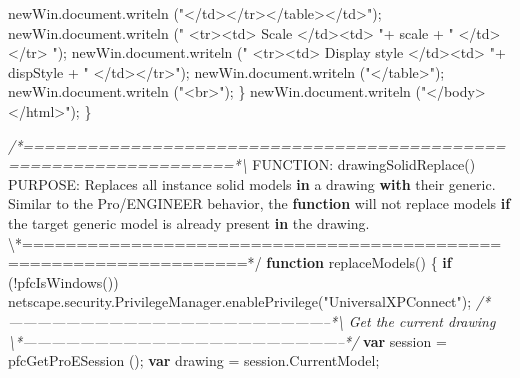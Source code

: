 \documentclass[]{article}
\newenvironment{Shaded}{}{}
\newcommand{\KeywordTok}[1]{\textcolor[rgb]{0.00,0.44,0.13}{\textbf{{#1}}}}
\newcommand{\StringTok}[1]{\textcolor[rgb]{0.25,0.44,0.63}{{#1}}}
\newcommand{\CommentTok}[1]{\textcolor[rgb]{0.38,0.63,0.69}{\textit{{#1}}}}
\newcommand{\OtherTok}[1]{\textcolor[rgb]{0.00,0.44,0.13}{{#1}}}
\newcommand{\FunctionTok}[1]{\textcolor[rgb]{0.02,0.16,0.49}{{#1}}}
\newcommand{\NormalTok}[1]{{#1}}
\begin{document}
\begin{Shaded}
\begin{Highlighting}[]
      \OtherTok{newWin}\NormalTok{.}\OtherTok{document}\NormalTok{.}\FunctionTok{writeln} \NormalTok{(}\StringTok{"</td></tr></table></td>"}\NormalTok{);}
      \OtherTok{newWin}\NormalTok{.}\OtherTok{document}\NormalTok{.}\FunctionTok{writeln} \NormalTok{(}\StringTok{" <tr><td> Scale </td><td> "}\NormalTok{+ scale + }
                   \StringTok{" </td></tr> "}\NormalTok{);}
      \OtherTok{newWin}\NormalTok{.}\OtherTok{document}\NormalTok{.}\FunctionTok{writeln} \NormalTok{(}\StringTok{" <tr><td> Display style </td><td> "}\NormalTok{+ }
                   \NormalTok{dispStyle + }\StringTok{" </td></tr>"}\NormalTok{);}
      \OtherTok{newWin}\NormalTok{.}\OtherTok{document}\NormalTok{.}\FunctionTok{writeln} \NormalTok{(}\StringTok{"</table>"}\NormalTok{);}
      \OtherTok{newWin}\NormalTok{.}\OtherTok{document}\NormalTok{.}\FunctionTok{writeln} \NormalTok{(}\StringTok{"<br>"}\NormalTok{);}
    \NormalTok{\}}
  \OtherTok{newWin}\NormalTok{.}\OtherTok{document}\NormalTok{.}\FunctionTok{writeln} \NormalTok{(}\StringTok{"</body></html>"}\NormalTok{);}
\NormalTok{\}}

\CommentTok{/*==================================================================*\textbackslash{}}
\NormalTok{FUNCTION: }\FunctionTok{drawingSolidReplace}\NormalTok{()}
\NormalTok{PURPOSE:  Replaces all instance solid models }\KeywordTok{in} \NormalTok{a drawing }\KeywordTok{with} \NormalTok{their}
          \OtherTok{generic}\NormalTok{.  }\FunctionTok{Similar} \FunctionTok{to} \FunctionTok{the} \FunctionTok{Pro}\NormalTok{/ENGINEER behavior,  }
          \NormalTok{the }\KeywordTok{function} \NormalTok{will not replace models }\KeywordTok{if} \NormalTok{the target generic }
          \NormalTok{model is already present }\KeywordTok{in} \NormalTok{the }\OtherTok{drawing}\NormalTok{.}
\NormalTok{\textbackslash{}*==================================================================*}\OtherTok{/}
\KeywordTok{function} \FunctionTok{replaceModels}\NormalTok{()}
\NormalTok{\{}
  \KeywordTok{if} \NormalTok{(!}\FunctionTok{pfcIsWindows}\NormalTok{())}
    \OtherTok{netscape}\NormalTok{.}\OtherTok{security}\NormalTok{.}\OtherTok{PrivilegeManager}\NormalTok{.}\FunctionTok{enablePrivilege}\NormalTok{(}\StringTok{"UniversalXPConnect"}\NormalTok{); }
\CommentTok{/*--------------------------------------------------------------------*\textbackslash{} }
\CommentTok{  Get the current drawing}
\CommentTok{\textbackslash{}*--------------------------------------------------------------------*/}
  \KeywordTok{var} \NormalTok{session = }\FunctionTok{pfcGetProESession} \NormalTok{();}
  \KeywordTok{var} \NormalTok{drawing = }\OtherTok{session}\NormalTok{.}\FunctionTok{CurrentModel}\NormalTok{;}
  

\end{Highlighting}
\end{Shaded}
\end{document}

